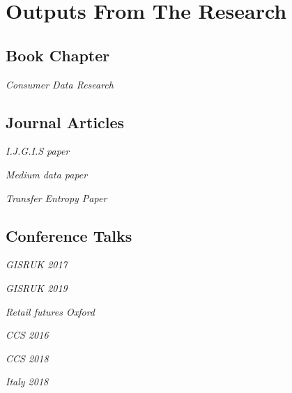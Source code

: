 

\chapter*{Outputs From The Research}
  
\section*{Book Chapter}
  \par {}\hspace{1.5em}
  \textit{Consumer Data Research} 
\section*{Journal Articles}
  \par {}\hspace{1.5em}
  \textit{I.J.G.I.S paper}
  \vspace{0.25cm} \par {}\hspace{1.5em}
  \textit{Medium data paper}
  \vspace{0.25cm} \par {}\hspace{1.5em}
  \textit{Transfer Entropy Paper}
\section*{Conference Talks}
  \par {}\hspace{1.5em}
  \textit{GISRUK 2017}
  \vspace{0.25cm} \par {}\hspace{1.5em}
  \textit{GISRUK 2019}
  \vspace{0.25cm} \par {}\hspace{1.5em}
  \textit{Retail futures Oxford}
  \vspace{0.25cm} \par {}\hspace{1.5em}
  \textit{CCS 2016}
  \vspace{0.25cm} \par {}\hspace{1.5em}
  \textit{CCS 2018}
  \vspace{0.25cm} \par {}\hspace{1.5em}
  \textit{Italy 2018}
